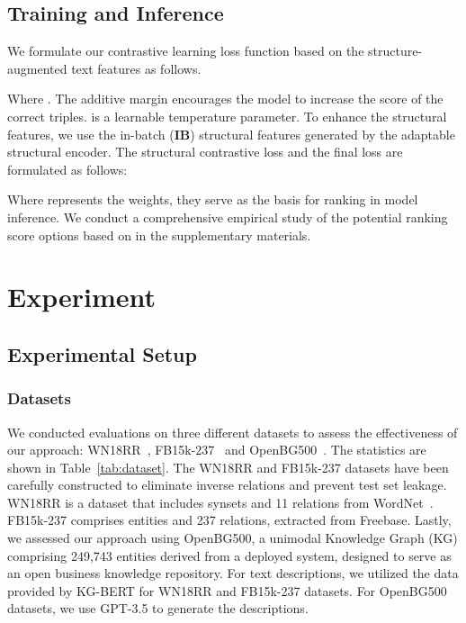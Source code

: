 \documentclass[11pt]{article}
\begin{document}
\subsection{Training and Inference}
We formulate our contrastive learning loss function based on the structure-augmented text features as follows.


Where . The additive margin  encourages the model to increase the score of the correct triples.  is a learnable temperature parameter. To enhance the structural features, we use the in-batch (\textbf{IB}) structural features generated by the adaptable structural encoder. The structural contrastive loss  and the final loss  are formulated as follows:



Where  represents the weights, they serve as the basis for ranking in model inference. We conduct a comprehensive empirical study of the potential ranking score options based on  in the
supplementary materials.

\section{Experiment}

\subsection{Experimental Setup}
\subsubsection{Datasets}
We conducted evaluations on three different datasets to assess the effectiveness of our approach: WN18RR~\cite{Dettmers2017Convolutional2K}, FB15k-237~\cite{Ma2015KnowledgeGI} and OpenBG500~\cite{Deng2022ConstructionAA}. The statistics are shown in Table~\ref{tab:dataset}. The WN18RR and FB15k-237 datasets have been carefully constructed to eliminate inverse relations and prevent test set leakage. WN18RR is a dataset that includes  synsets and 11 relations from WordNet~\cite{miller1995wordnet}. FB15k-237 comprises  entities and 237 relations, extracted from Freebase. Lastly, we assessed our approach using OpenBG500, a unimodal Knowledge Graph (KG) comprising 249,743 entities derived from a deployed system, designed to serve as an open business knowledge repository. For text descriptions, we utilized the data provided by KG-BERT\cite{yao2019kg} for WN18RR and FB15k-237 datasets. For OpenBG500 datasets, we use GPT-3.5\cite{Chen2020BigSM} to generate the descriptions.
\end{document}
